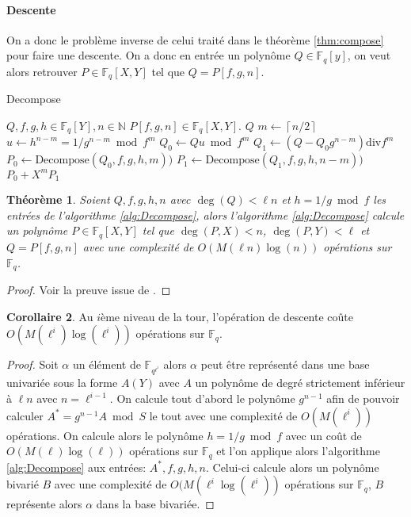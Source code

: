 \documentclass[10pt,a4paper]{book}
\theoremstyle{plain}
\newtheorem{thm}{Théorème}
\theoremstyle{definition}
\theoremstyle{definition}
\newtheorem{cor}[thm]{Corollaire}
\theoremstyle{definition}
\theoremstyle{definition}
\theoremstyle{remark}
\theoremstyle{remark}
\begin{document}
\paragraph{Descente}
On a donc le problème inverse de celui traité dans le théorème \ref{thm:compose} pour faire une descente. On a donc en entrée un polynôme $Q \in \mathbb{F}_q[y]$, on veut alors retrouver $P\in \mathbb{F}_q[X,Y]$ tel que $Q=P[f,g,n]$. 
\begin{algorithm}
\caption{\label{alg:Decompose}Decompose}
\begin{algorithmic}[1]
\REQUIRE $Q,f,g,h \in \mathbb{F}_q[Y], n \in \mathbb{N}$
\ENSURE $P[f,g,n] \in \mathbb{F}_q[X,Y]$.
 \RETURN $Q$
\ELSE
\STATE $m \gets \left\lceil n/2 \right\rceil   $
\STATE $u \gets h^{n-m}=1/g^{n-m} \bmod f^m$
\STATE $Q_0 \gets Qu \bmod f^m$
\STATE $Q_1 \gets (Q-Q_0g^{n-m}) \mathrm{div} f^m$
\STATE $P_0 \gets \textrm{Decompose}(Q_0,f,g,h,m))$
\STATE $P_1 \gets \textrm{Decompose}(Q_1,f,g,h,n-m))$
\RETURN $P_0 + X^mP_1$ 
\ENDIF
\end{algorithmic}
\end{algorithm}

\begin{thm}
Soient $Q,f,g,h,n$ avec $\deg(Q)<\ell n$ et $h=1/g \bmod f$ les entrées de l'algorithme \ref{alg:Decompose}, alors l'algorithme \ref{alg:Decompose} calcule un polynôme $P \in \mathbb{F}_q[X,Y]$ tel que $\deg(P,X)<n$, $\deg(P,Y)<\ell$ et $Q=P[f,g,n]$ avec une complexité de $O(M(\ell n) \log(n))$ opérations sur $\mathbb{F}_q$.
\end{thm}

\begin{proof}
Voir la preuve issue de \cite{DeFeo-Doliskani-Schost13}.
\end{proof}

\begin{cor}
Au $i$ème niveau de la tour, l'opération de descente coûte $O(M(\ell^i)\log(\ell^i))$ opérations sur $\mathbb{F}_q$.
\end{cor}

\begin{proof}
Soit $\alpha$ un élément de $\mathbb{F}_{q^{\ell^i}}$ alors $\alpha$ peut être représenté dans une base univariée sous la forme $A(Y)$ avec $A$ un polynôme de degré strictement inférieur à $\ell n $ avec $n=\ell^{i-1}$. On calcule tout d'abord le polynôme $g^{n-1}$ afin de pouvoir calculer $A^*=g^{n-1}A \bmod S$ le tout avec une complexité de $O(M(\ell^i))$ opérations. On calcule alors le polynôme $h=1/g \bmod f$ avec un coût de $O(M(\ell)\log(\ell))$ opérations sur $\mathbb{F}_q$ et l'on applique alors l'algorithme \ref{alg:Decompose} aux entrées: $A^*,f,g,h,n$. Celui-ci calcule alors un polynôme bivarié $B$ avec une complexité de $O(M(\ell^i\log(\ell^i))$ opérations sur $\mathbb{F}_q$, $B$ représente alors $\alpha$ dans la base bivariée.
\end{proof}
\end{document}
